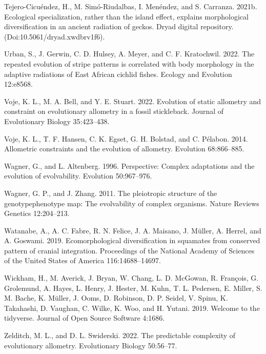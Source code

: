 \documentclass[
  11pt,
]{article}
\begin{document}
\leavevmode\hypertarget{ref-PristurusData}{}%
Tejero-Cicuéndez, H., M. Simó-Riudalbas, I. Menéndez, and S. Carranza.
2021b. Ecological specialization, rather than the island effect,
explains morphological diversification in an ancient radiation of
geckos. Dryad digital repository. (Doi:10.5061/dryad.xwdbrv1f6).

\leavevmode\hypertarget{ref-Urban2022}{}%
Urban, S., J. Gerwin, C. D. Hulsey, A. Meyer, and C. F. Kratochwil.
2022. The repeated evolution of stripe patterns is correlated with body
morphology in the adaptive radiations of East African cichlid fishes.
Ecology and Evolution 12:e8568.

\leavevmode\hypertarget{ref-Voje2022}{}%
Voje, K. L., M. A. Bell, and Y. E. Stuart. 2022. Evolution of static
allometry and constraint on evolutionary allometry in a fossil
stickleback. Journal of Evolutionary Biology 35:423--438.

\leavevmode\hypertarget{ref-Voje2014}{}%
Voje, K. L., T. F. Hansen, C. K. Egset, G. H. Bolstad, and C. Pélabon.
2014. Allometric constraints and the evolution of allometry. Evolution
68:866--885.

\leavevmode\hypertarget{ref-Wagner1996}{}%
Wagner, G., and L. Altenberg. 1996. Perspective: Complex adaptations and
the evolution of evolvability. Evolution 50:967--976.

\leavevmode\hypertarget{ref-Wagner2011}{}%
Wagner, G. P., and J. Zhang. 2011. The pleiotropic structure of the
genotypephenotype map: The evolvability of complex organisms. Nature
Reviews Genetics 12:204--213.

\leavevmode\hypertarget{ref-Watanabe2019}{}%
Watanabe, A., A. C. Fabre, R. N. Felice, J. A. Maisano, J. Müller, A.
Herrel, and A. Goswami. 2019. Ecomorphological diversification in
squamates from conserved pattern of cranial integration. Proceedings of
the National Academy of Sciences of the United States of America
116:14688--14697.

\leavevmode\hypertarget{ref-Wickham2019}{}%
Wickham, H., M. Averick, J. Bryan, W. Chang, L. D. McGowan, R. François,
G. Grolemund, A. Hayes, L. Henry, J. Hester, M. Kuhn, T. L. Pedersen, E.
Miller, S. M. Bache, K. Müller, J. Ooms, D. Robinson, D. P. Seidel, V.
Spinu, K. Takahashi, D. Vaughan, C. Wilke, K. Woo, and H. Yutani. 2019.
Welcome to the tidyverse. Journal of Open Source Software 4:1686.

\leavevmode\hypertarget{ref-Zelditch2022}{}%
Zelditch, M. L., and D. L. Swiderski. 2022. The predictable complexity
of evolutionary allometry. Evolutionary Biology 50:56--77.
\end{document}

